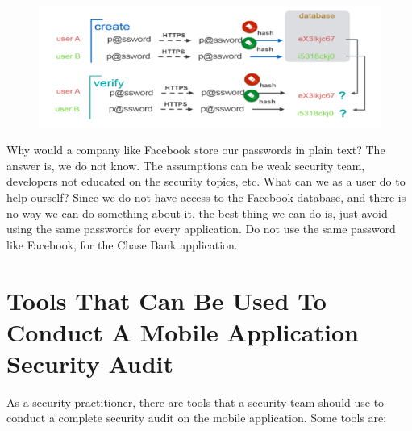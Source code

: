 \documentclass{article}
\begin{document}
\begin{figure}[h!]
\centering
\includegraphics[]{fig.PNG}
\end{figure}
Why would a company like Facebook store our passwords in plain text? The answer is, we do not know. The assumptions can be weak security team, developers not educated on the security topics, etc. What can we as a user do to help ourself? Since we do not have access to the Facebook database, and there is no way we can do something about it, the best thing we can do is, just avoid using the same passwords for every application. Do not use the same password like Facebook, for the Chase Bank application.\\
\vspace{150mm}
\section{Tools That Can Be Used To Conduct A Mobile Application Security Audit}
As a  security practitioner, there are tools that a security team should use to conduct a complete security audit on the mobile application. Some tools are:\\
\end{document}
